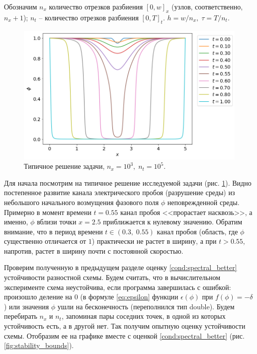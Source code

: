 Обозначим $n_x$ количество отрезков разбиения $[0, w]_x$ (узлов, соответственно, $n_x + 1$); $n_t$ -- количество отрезков разбиения $[0, T]_t$. $h = w/n_x, \; \tau = T/n_t$.

\begin{figure}[!tp]
    \centering
    \includegraphics[width=\textwidth]{figures/typical_solution.png}
    \vspace{-0.8cm}
    \caption{Типичное решение задачи, $n_x = 10^3, \; n_t = 10^5$.}
    \label{fig:typical_solution}
\end{figure}

Для начала посмотрим на типичное решение исследуемой задачи (рис. \ref{fig:typical_solution}). Видно постепенное развитие канала электрического пробоя (разрушение среды) из небольшого начального возмущения фазового поля $\phi$ неповрежденной среды. Примерно в момент времени $t = 0.55$ канал пробоя <<прорастает насквозь>>, а именно, $\phi$ вблизи точки $x = 2.5$ приближается к нулевому значению. Обратим внимание, что в период времени $t \in (0.3, \; 0.55)$ канал пробоя (область, где $\phi$ существенно отличается от $1$) практически не растет в ширину, а при $t > 0.55$, напротив, растет в ширину почти с постоянной скоростью.

Проверим полученную в предыдущем разделе оценку \eqref{cond:spectral_better} устойчивости разностной схемы. Будем считать, что в вычислительном эксперименте схема неустойчива, если программа завершилась с ошибкой: произошло деление на $0$ (в формуле \eqref{eq:epsilon} функции $\epsilon(\phi)$ при $f(\phi) = -\delta$) или значения $\phi$ ушли на бесконечность (переполнился тип double). Будем перебирать $n_x$ и $n_t$, запоминая пары соседних точек, в одной из которых устойчивость есть, а в другой нет. Так получим опытную оценку устойчивости схемы. Отобразим ее на графике вместе с оценкой \eqref{cond:spectral_better} (рис. \ref{fig:stability_bounds}).

